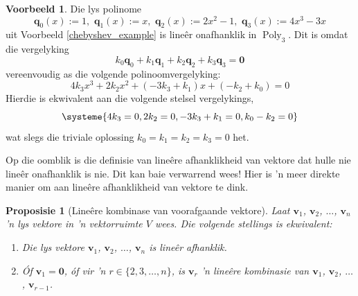 \documentclass[a4paper,11pt]{book}
\newtheorem{proposition}[theorem]{Proposisie}
\theoremstyle{definition}
\newtheorem{example_environment}{Voorbeeld}[chapter]
\newcommand{\ve}[1]{\mathbf{#1}}
\newenvironment{example}
	{
		\begin{oframed}
		\begin{example_environment}
	}
	{
		\end{example_environment}
		\end{oframed}
	}
\DeclareMathOperator{\Poly}{Poly}
\begin{document}
\begin{example} 
	\label{new_basis_for_poly_3}
	Die lys polinome
	\[
		\ve{q}_0 (x) := 1, \,\, \ve{q}_1 (x) := x, \,\, \ve{q}_2 (x) :=
		2x^2 - 1, \,\, \ve{q}_3 (x) := 4x^3 - 3x
	\]
	uit Voorbeeld \ref{chebyshev_example} is line{\^e}r onafhanklik in
	$\Poly_3$. Dit is omdat die vergelyking
	\[
		k_0 \ve{q}_0 + k_1 \ve{q}_1 + k_2 \ve{q}_2 + k_3 \ve{q}_3 = \ve{0}
	\]
	vereenvoudig as die volgende polinoomvergelyking:
	\[
		4k_3 x^3 + 2k_2 x^2 + (-3k_3 + k_1) x + (-k_2 + k_0) = 0
	\]
	Hierdie is ekwivalent aan die volgende stelsel vergelykings,
	\[
		\systeme{ 4k_3 = 0, 2k_2 = 0, -3 k_3 + k_1 = 0 , k_0 - k_2 = 0}
	\]
	wat slegs die triviale oplossing $k_0 = k_1 = k_2 = k_3 = 0$ het.
\end{example}
Op die oomblik is die definisie van line{\^e}re afhanklikheid van vektore
dat hulle nie line{\^e}r onafhanklik is nie. Dit kan baie verwarrend wees!
Hier is 'n meer direkte manier om aan line{\^e}re afhanklikheid van vektore
te dink.
\begin{proposition}[Line{\^e}re kombinase van voorafgaande vektore]
	\label{lin_dependence_prop} Laat $\ve{v}_1$,
	$\ve{v}_2$, $\ldots$, $\ve{v}_n$ 'n lys vektore in 'n vektorruimte $V$
	wees. Die volgende stellings is ekwivalent:
	\begin{enumerate}
		\item Die lys vektore $\ve{v}_1$, $\ve{v}_2$, $\ldots$, $\ve{v}_n$
			is line{\^e}r afhanklik.
		\item Óf $\ve{v}_1 = \ve{0}$, óf vir 'n $r \in \{2, 3, \ldots,
			n\}$, is $\ve{v}_r$ 'n line{\^e}re kombinasie van $\ve{v}_1$,
			$\ve{v}_2$, $\ldots$, $\ve{v}_{r-1}$.
	\end{enumerate}
\end{proposition}
\end{document}
